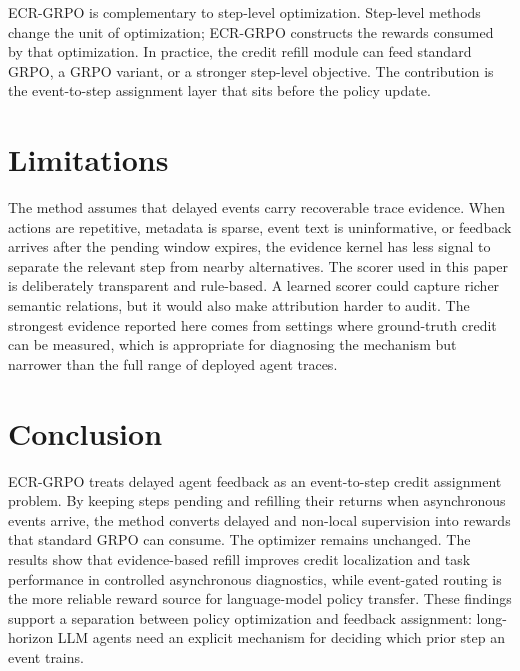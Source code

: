 \documentclass[letterpaper]{article} %
\begin{document}
ECR-GRPO is complementary to step-level optimization. Step-level methods change the unit of optimization; ECR-GRPO constructs the rewards consumed by that optimization. In practice, the credit refill module can feed standard GRPO, a GRPO variant, or a stronger step-level objective. The contribution is the event-to-step assignment layer that sits before the policy update.

\section{Limitations}

The method assumes that delayed events carry recoverable trace evidence. When actions are repetitive, metadata is sparse, event text is uninformative, or feedback arrives after the pending window expires, the evidence kernel has less signal to separate the relevant step from nearby alternatives. The scorer used in this paper is deliberately transparent and rule-based. A learned scorer could capture richer semantic relations, but it would also make attribution harder to audit. The strongest evidence reported here comes from settings where ground-truth credit can be measured, which is appropriate for diagnosing the mechanism but narrower than the full range of deployed agent traces.

\section{Conclusion}

ECR-GRPO treats delayed agent feedback as an event-to-step credit assignment problem. By keeping steps pending and refilling their returns when asynchronous events arrive, the method converts delayed and non-local supervision into rewards that standard GRPO can consume. The optimizer remains unchanged. The results show that evidence-based refill improves credit localization and task performance in controlled asynchronous diagnostics, while event-gated routing is the more reliable reward source for language-model policy transfer. These findings support a separation between policy optimization and feedback assignment: long-horizon LLM agents need an explicit mechanism for deciding which prior step an event trains.



\end{document}
